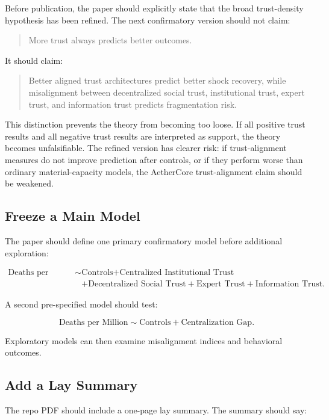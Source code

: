 \documentclass[12pt]{article}
\begin{document}
Before publication, the paper should explicitly state that the broad trust-density hypothesis has been refined. The next confirmatory version should not claim:

\begin{quote}
More trust always predicts better outcomes.
\end{quote}

It should claim:

\begin{quote}
Better aligned trust architectures predict better shock recovery, while misalignment between decentralized social trust, institutional trust, expert trust, and information trust predicts fragmentation risk.
\end{quote}

This distinction prevents the theory from becoming too loose. If all positive trust results and all negative trust results are interpreted as support, the theory becomes unfalsifiable. The refined version has clearer risk: if trust-alignment measures do not improve prediction after controls, or if they perform worse than ordinary material-capacity models, the AetherCore trust-alignment claim should be weakened.

\subsection{Freeze a Main Model}

The paper should define one primary confirmatory model before additional exploration:

\begin{align*}
\text{Deaths per Million} \sim{}&
\text{Controls} +
\text{Centralized Institutional Trust} \\
&+
\text{Decentralized Social Trust} +
\text{Expert Trust} +
\text{Information Trust}.
\end{align*}

A second pre-specified model should test:

\[
\text{Deaths per Million} \sim
\text{Controls} +
\text{Centralization Gap}.
\]

Exploratory models can then examine misalignment indices and behavioral outcomes.

\subsection{Add a Lay Summary}

The repo PDF should include a one-page lay summary. The summary should say:
\end{document}
